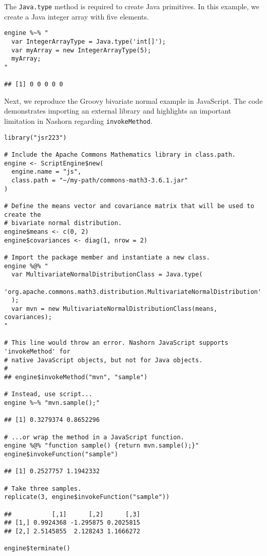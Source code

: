 \documentclass[
article,
11pt, %
a4paper, %
oneside, %
headinclude,footinclude, %
]{scrartcl}
\theoremstyle{definition} %
\theoremstyle{plain} %
\theoremstyle{remark} %
\newcommand{\code}[1]{\texttt{#1}}
\begin{document}
The \code{Java.type} method is required to create Java primitives. In this example, we create a Java integer array with five elements.

\begin{verbatim}
engine %~% "
  var IntegerArrayType = Java.type('int[]');
  var myArray = new IntegerArrayType(5);
  myArray;
"

## [1] 0 0 0 0 0
\end{verbatim}

Next, we reproduce the Groovy bivariate normal example in JavaScript. The code demonstrates importing an external library and highlights an important limitation in Nashorn regarding \code{invokeMethod}.

\begin{verbatim}
library("jsr223")

# Include the Apache Commons Mathematics library in class.path.
engine <- ScriptEngine$new(
  engine.name = "js",
  class.path = "~/my-path/commons-math3-3.6.1.jar"
)

# Define the means vector and covariance matrix that will be used to create the
# bivariate normal distribution.
engine$means <- c(0, 2)
engine$covariances <- diag(1, nrow = 2)

# Import the package member and instantiate a new class.
engine %@% "
  var MultivariateNormalDistributionClass = Java.type(
    'org.apache.commons.math3.distribution.MultivariateNormalDistribution'
  );
  var mvn = new MultivariateNormalDistributionClass(means, covariances);
"

# This line would throw an error. Nashorn JavaScript supports 'invokeMethod' for
# native JavaScript objects, but not for Java objects.
#
## engine$invokeMethod("mvn", "sample")

# Instead, use script...
engine %~% "mvn.sample();"

## [1] 0.3279374 0.8652296

# ...or wrap the method in a JavaScript function.
engine %@% "function sample() {return mvn.sample();}"
engine$invokeFunction("sample")

## [1] 0.2527757 1.1942332

# Take three samples.
replicate(3, engine$invokeFunction("sample"))

##           [,1]      [,2]      [,3]
## [1,] 0.9924368 -1.295875 0.2025815
## [2,] 2.5145855  2.128243 1.1666272

engine$terminate()
\end{verbatim}
\end{document}
